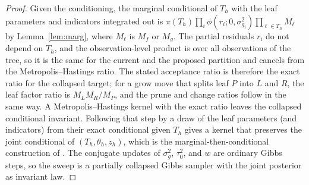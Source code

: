 \documentclass[11pt]{article}
\theoremstyle{definition}
\theoremstyle{plain}
\begin{document}
{\begin{proof}
Given the conditioning, the marginal conditional of $T_h$ with the leaf parameters and indicators integrated out is $\pi(T_h)\prod_i\phi(r_i;0,\sigma^2_{g_i})\prod_{\ell\in T_h}M_\ell$ by Lemma~\ref{lem:marg}, where $M_\ell$ is $M_f$ or $M_g$. The partial residuals $r_i$ do not depend on $T_h$, and the observation-level product is over all observations of the tree, so it is the same for the current and the proposed partition and cancels from the Metropolis--Hastings ratio. The stated acceptance ratio is therefore the exact ratio for the collapsed target; for a grow move that splits leaf $P$ into $L$ and $R$, the leaf factor ratio is $M_LM_R/M_P$, and the prune and change ratios follow in the same way. A Metropolis--Hastings kernel with the exact ratio leaves the collapsed conditional invariant. Following that step by a draw of the leaf parameters (and indicators) from their exact conditional given $T_h$ gives a kernel that preserves the joint conditional of $(T_h,\theta_h,z_h)$, which is the marginal-then-conditional construction of \citet{Chipman2010BART}. The conjugate updates of $\sigma_g^2$, $\tau_0^2$, and $w$ are ordinary Gibbs steps, so the sweep is a partially collapsed Gibbs sampler with the joint posterior as invariant law.
\end{proof}

}
\end{document}
